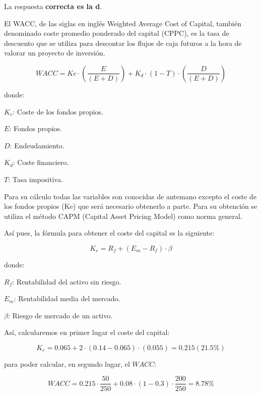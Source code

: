 \documentclass[
  letterpaper,
  DIV=11,
  numbers=noendperiod]{scrreprt}
\begin{document}
\begin{tcolorbox}[enhanced jigsaw, left=2mm, opacityback=0, colback=white, breakable, arc=.35mm, bottomrule=.15mm, rightrule=.15mm, toprule=.15mm, leftrule=.75mm, colframe=quarto-callout-tip-color-frame]
\begin{minipage}[t]{5.5mm}
\textcolor{quarto-callout-tip-color}{\faLightbulb}
\end{minipage}%
\begin{minipage}[t]{\textwidth - 5.5mm}

La respuesta \textbf{correcta es la d}.

El WACC, de las siglas en inglés Weighted Average Cost of Capital,
también denominado coste promedio ponderado del capital (CPPC), es la
tasa de descuento que se utiliza para descontar los flujos de caja
futuros a la hora de valorar un proyecto de inversión.

\[WACC = Ke \cdot \left(\frac{E}{(E+D)}\right) + K_d \cdot (1-T) \cdot \left(\frac{D}{(E+D)}\right)\]

donde:

\(K_e\): Coste de los fondos propios.

\(E\): Fondos propios.

\(D\): Endeudamiento.

\(K_d\): Coste financiero.

\(T\): Tasa impositiva.

Para su cálculo todas las variables son conocidas de antemano excepto el
coste de los fondos propios (Ke) que será necesario obtenerlo a parte.
Para su obtención se utiliza el método CAPM (Capital Asset Pricing
Model) como norma general.

Así pues, la fórmula para obtener el coste del capital es la siguiente:

\[K_e = R_f + (E_m - R_f)\cdot \beta\]

donde:

\(R_f\): Rentabilidad del activo sin riesgo.

\(E_m\): Rentabilidad media del mercado.

\(\beta\): Riesgo de mercado de un activo.

Así, calcularemos en primer lugar el coste del capital:

\[K_e=0.065+2\cdot (0.14-0.065)\cdot (0.055)=0.215(21.5\%)\]

para poder calcular, en segundo lugar, el \(WACC\):

\[WACC=0.215\cdot\frac{50}{250}+0.08\cdot\left(1-0.3\right)\cdot\frac{200}{250}=8.78\%\]


\end{minipage}
\end{tcolorbox}
\end{document}
